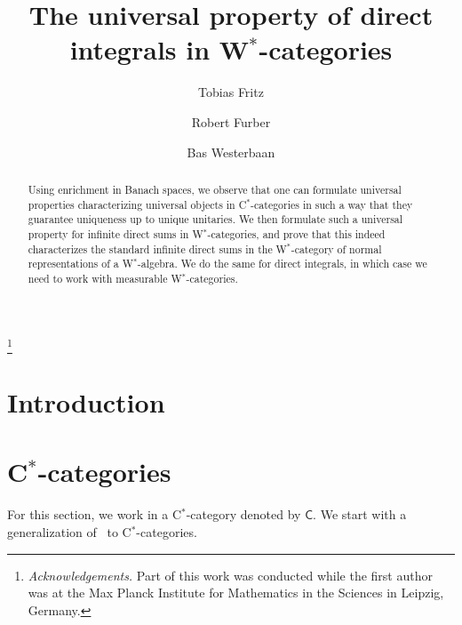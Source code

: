 \documentclass[reqno,T1]{amsproc}
\newcommand{\cat}[1]{\mathsf{#1}}		%
\theoremstyle{plain}
\theoremstyle{remark}
\numberwithin{equation}{section}
\begin{document}
\sloppy

\setlength{\jot}{6pt}



\title{The universal property of direct integrals in W$^*$-categories}

\author{Tobias Fritz}
\author{Robert Furber}
\author{Bas Westerbaan}

\address{Perimeter Institute for Theoeretical Physics}

\address{add your affiliation here}

\keywords{}


\thanks{\textit{Acknowledgements.} Part of this work was conducted while the first author was at the Max Planck Institute for Mathematics in the Sciences in Leipzig, Germany.}

\begin{abstract}
Using enrichment in Banach spaces, we observe that one can formulate universal properties characterizing universal objects in C$^*$-categories in such a way that they guarantee uniqueness up to unique unitaries. We then formulate such a universal property for infinite direct sums in W$^*$-categories, and prove that this indeed characterizes the standard infinite direct sums in the W$^*$-category of normal representations of a W$^*$-algebra. We do the same for direct integrals, in which case we need to work with measurable W$^*$-categories.
\end{abstract}

\maketitle

\section{Introduction}


\section{C$^*$-categories}

For this section, we work in a C$^*$-category \cite{wstarcat} denoted by $\cat{C}$.
We start with a generalization of~\cite[Lemma 7]{westerbaan2016universal}
    to C$^*$-categories.
\end{document}
